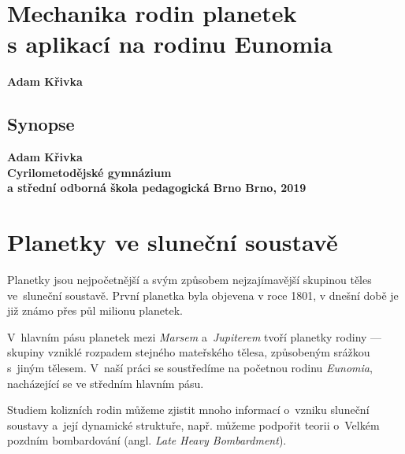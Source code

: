\documentclass[a4paper, 12pt]{article}
\begin{document}
\pagestyle{empty}
{\centering \section*{\Huge Mechanika rodin planetek\\s aplikací na rodinu Eunomia}
\textbf{Adam Křivka}
\subsection*{\LARGE Synopse}}

\vfill

\renewcommand{\baselinestretch}{0.75}\normalsize
\tableofcontents
\renewcommand{\baselinestretch}{1.3}\normalsize

\vfill
\textbf{Adam Křivka\\
Cyrilometodějské gymnázium\\ a střední odborná škola pedagogická Brno \hfill Brno, 2019}
\newpage

\section{Planetky ve sluneční soustavě}
Planetky jsou nejpočetnější a svým způsobem nejzajímavější skupinou těles ve~sluneční soustavě. První planetka byla objevena v roce 1801, v dnešní době je již známo přes půl milionu planetek.

V~hlavním pásu planetek mezi \textit{Marsem} a~\textit{Jupiterem} tvoří planetky rodiny --- skupiny vzniklé rozpadem stejného mateřského tělesa, způsobeným srážkou s~jiným tělesem. V~naší práci se soustředíme na početnou rodinu \textit{Eunomia}, nacházející se ve středním hlavním pásu.

Studiem kolizních rodin můžeme zjistit mnoho informací o~vzniku sluneční soustavy a~její dynamické struktuře, např. můžeme podpořit teorii o~Velkém pozdním bombardování (angl. \textit{Late Heavy Bombardment}).
\newpage
\end{document}
